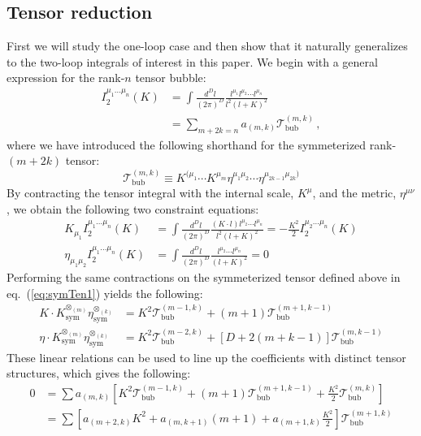 \documentclass[12pt,letter]{article}
\def\eqn#1{eq.~(\ref{#1})}
\begin{document}
\subsection{Tensor reduction}\label{sec:tenRed}
First we will study the one-loop case and then show that it naturally generalizes to the two-loop integrals of interest in this paper. We begin with a general expression for the rank-$n$ tensor bubble:
\begin{align}
     I^{\mu_1\dots \mu_n}_2(K)&= \int \frac{d^D l}{(2\pi)^D} \frac{l^{\mu_1}l^{\mu_2}\cdots l^{\mu_n} }{l^2(l+K)^2}
     \\
     &= \sum_{m+2k=n}a_{(m,k)} \mathcal{T}^{(m,k)}_{\text{bub}} \,,\label{tensorReductionBubble}
\end{align}
where we have introduced the following shorthand for the symmeterized rank-$(m+2k)$ tensor:
\begin{equation}\label{eq:symTen1}
\mathcal{T}^{(m,k)}_{\text{bub}}  \equiv K^{(\mu_1}\cdots K^{\mu_m}\eta^{\mu_1\mu_2}\cdots \eta^{\mu_{2k-1}\mu_{2k})}
\end{equation}
By contracting the tensor integral with the internal scale, $K^\mu$, and the metric, $\eta^{\mu\nu}$, we obtain the following two constraint equations:
\begin{align}
K_{\mu_1}I^{\mu_1\dots \mu_n}_2(K) &= \int \frac{d^D l}{(2\pi)^D} \frac{ (K\cdot l) l^{\mu_2}\cdots l^{\mu_n}}{l^2(l+K)^2}= -\frac{K^2}{2}I^{\mu_2\dots \mu_n}_2(K) 
\\
\eta_{\mu_1 \mu_2}I^{\mu_1\dots \mu_n}_2(K)&= \int \frac{d^D l}{(2\pi)^D} \frac{  l^{\mu_2}\cdots l^{\mu_n}}{(l+K)^2}=0
\end{align}
Performing the same contractions on the symmeterized tensor defined above in \eqn{eq:symTen1} yields the following:
\begin{align}
K\cdot K^{\otimes_{(m)}}_{\text{sym}}\eta_{\text{sym}}^{\otimes_{(k)}} &= K^2 \mathcal{T}^{(m-1,k)}_{\text{bub}} + (m+1)\mathcal{T}^{(m+1,k-1)}_{\text{bub}}
\\
\eta \cdot K^{\otimes_{(m)}}_{\text{sym}}\eta_{\text{sym}}^{\otimes_{(k)}} &= K^2 \mathcal{T}^{(m-2,k)}_{\text{bub}} + \left[D+2(m+k-1)\right]\mathcal{T}^{(m,k-1)}_{\text{bub}}
\end{align}
These linear relations can be used to line up the coefficients with distinct tensor structures, which gives the following:
\begin{align}
0&= \sum a_{(m,k)}\left[K^2 \mathcal{T}^{(m-1,k)}_{\text{bub}}+ (m+1)\mathcal{T}^{(m+1,k-1)}_{\text{bub}} +\frac{K^2}{2}\mathcal{T}^{(m,k)}_{\text{bub}}\right]
\\
&= \sum \left[a_{(m+2,k)} K^2 + a_{(m,k+1)} (m+1) +a_{(m+1,k)}\frac{K^2}{2}\right]\mathcal{T}^{(m+1,k)}_{\text{bub}}\end{align}
\end{document}

